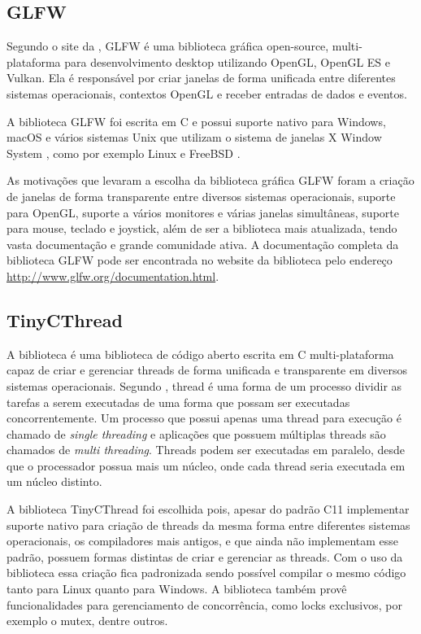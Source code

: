 \documentclass[12pt, %
openright,
oneside, %
a4paper,    %
brazil]{facom-ufu-abntex2}
\begin{document}
\subsection{GLFW}
Segundo o site da , GLFW é uma biblioteca gráfica open-source, multi-plataforma para desenvolvimento desktop utilizando OpenGL, OpenGL ES e Vulkan. Ela é responsável por criar janelas de forma unificada entre diferentes sistemas operacionais, contextos OpenGL e receber entradas de dados e eventos.

A biblioteca GLFW foi escrita em C e possui suporte nativo para Windows, macOS e vários sistemas Unix \cite{Unix:About} que utilizam o sistema de janelas X Window System \cite{X:About}, como por exemplo Linux \cite{Linux:About} e FreeBSD \cite{FreeBSD:About}.

As motivações que levaram a escolha da biblioteca gráfica GLFW foram a criação de janelas de forma transparente entre diversos sistemas operacionais, suporte para OpenGL, suporte a vários monitores e várias janelas simultâneas, suporte para mouse, teclado e joystick, além de ser a biblioteca mais atualizada, tendo vasta documentação e grande comunidade ativa. A documentação completa da biblioteca GLFW pode ser encontrada no website da biblioteca pelo endereço \hyperref[http://www.glfw.org/documentation.html]{http://www.glfw.org/documentation.html}.

\subsection{TinyCThread}
A biblioteca  é uma biblioteca de código aberto escrita em C multi-plataforma capaz de criar e gerenciar threads de forma unificada e transparente em diversos sistemas operacionais. Segundo , thread é uma forma de um processo dividir as tarefas a serem executadas de uma forma que possam ser executadas concorrentemente. Um processo que possui apenas uma thread para execução é chamado de \textit{single threading} e aplicações que possuem múltiplas threads são chamados de \textit{multi threading}. Threads podem ser executadas em paralelo, desde que o processador possua mais um núcleo, onde cada thread seria executada em um núcleo distinto.

A biblioteca TinyCThread foi escolhida pois, apesar do padrão C11 implementar suporte nativo para criação de threads da mesma forma entre diferentes sistemas operacionais, os compiladores mais antigos, e que ainda não implementam esse padrão, possuem formas distintas de criar e gerenciar as threads. Com o uso da biblioteca essa criação fica padronizada sendo possível compilar o mesmo código tanto para Linux quanto para Windows. A biblioteca também provê funcionalidades para gerenciamento de concorrência, como locks exclusivos, por exemplo o mutex, dentre outros.
\end{document}
